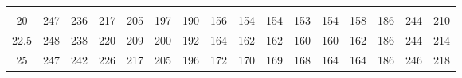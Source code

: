 \begin{table}[]
\begin{tabular}{@{}cccccccccccccccc@{}}
						  &                      &                      &                      &                      &                      &                      &                      &                      &                      &                      &                      &                      &                      &                         &                        \\
	\multirow{2}{*}{20}   & \multirow{2}{*}{247} & \multirow{2}{*}{236} & \multirow{2}{*}{217} & \multirow{2}{*}{205} & \multirow{2}{*}{197} & \multirow{2}{*}{190} & \multirow{2}{*}{156} & \multirow{2}{*}{154} & \multirow{2}{*}{154} & \multirow{2}{*}{153} & \multirow{2}{*}{154} & \multirow{2}{*}{158} & \multirow{2}{*}{186} & \multirow{2}{*}{244}    & \multirow{2}{*}{210}   \\
						  &                      &                      &                      &                      &                      &                      &                      &                      &                      &                      &                      &                      &                      &                         &                        \\
	\multirow{2}{*}{22.5} & \multirow{2}{*}{248} & \multirow{2}{*}{238} & \multirow{2}{*}{220} & \multirow{2}{*}{209} & \multirow{2}{*}{200} & \multirow{2}{*}{192} & \multirow{2}{*}{164} & \multirow{2}{*}{162} & \multirow{2}{*}{162} & \multirow{2}{*}{160} & \multirow{2}{*}{160} & \multirow{2}{*}{162} & \multirow{2}{*}{186} & \multirow{2}{*}{244}    & \multirow{2}{*}{214}   \\
						  &                      &                      &                      &                      &                      &                      &                      &                      &                      &                      &                      &                      &                      &                         &                        \\
	\multirow{2}{*}{25}   & \multirow{2}{*}{247} & \multirow{2}{*}{242} & \multirow{2}{*}{226} & \multirow{2}{*}{217} & \multirow{2}{*}{205} & \multirow{2}{*}{196} & \multirow{2}{*}{172} & \multirow{2}{*}{170} & \multirow{2}{*}{169} & \multirow{2}{*}{168} & \multirow{2}{*}{164} & \multirow{2}{*}{164} & \multirow{2}{*}{186} & \multirow{2}{*}{246}    & \multirow{2}{*}{218}   \\
						  &                      &                      &                      &                      &                      &                      &                      &                      &                      &                      &                      &                      &                      &                         &                        \\ \bottomrule
	\end{tabular}
	\end{table}

	